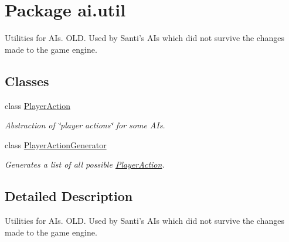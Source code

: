 \hypertarget{namespaceai_1_1util}{
\section{Package ai.util}
\label{namespaceai_1_1util}
}


Utilities for AIs. OLD. Used by Santi's AIs which did not survive the changes made to the game engine.  


\subsection*{Classes}
\begin{DoxyCompactItemize}
\item 
class \hyperlink{classai_1_1util_1_1_player_action}{PlayerAction}
\begin{DoxyCompactList}\small\item\em Abstraction of \char`\"{}player actions\char`\"{} for some AIs. \end{DoxyCompactList}\item 
class \hyperlink{classai_1_1util_1_1_player_action_generator}{PlayerActionGenerator}
\begin{DoxyCompactList}\small\item\em Generates a list of all possible \hyperlink{classai_1_1util_1_1_player_action}{PlayerAction}. \end{DoxyCompactList}\end{DoxyCompactItemize}


\subsection{Detailed Description}
Utilities for AIs. OLD. Used by Santi's AIs which did not survive the changes made to the game engine. 